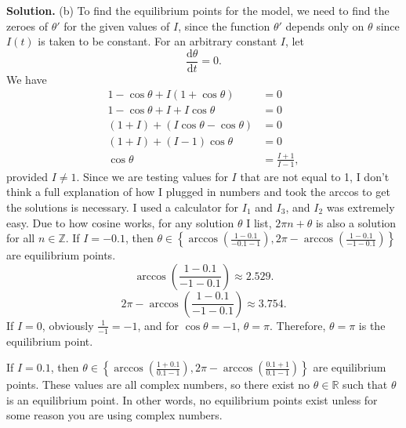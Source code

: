 \documentclass[11pt, letterpaper]{report}
\newenvironment{soln}[1][]{\noindent\textbf{Solution. }}{\hfill\qedsymbol}
\begin{document}
\begin{soln}
	(b) To find the equilibrium points for the model, we need to find the zeroes of $\theta '$ for the given values of $I$, since the function $\theta '$ depends only on $\theta $ since $I(t)$ is taken to be constant. For an arbitrary constant $I$, let
	\[
		\frac{\mathrm{d}\theta }{\mathrm{d}t} =0
	.\]
	We have
	\begin{align*}
		1-\cos \theta +I\left( 1+\cos \theta  \right) &=0\\
		1-\cos \theta +I+I\cos \theta &=0\\
		(1+I)+\left( I\cos \theta -\cos \theta  \right) &=0\\
		\left( 1+I \right) +\left( I-1 \right)\cos \theta  &=0\\
		\cos \theta &=\frac{I+1}{I-1}
	,\end{align*}
	provided $I\neq 1$. Since we are testing values for $I$ that are not equal to 1, I don't think a full explanation of how I plugged in numbers and took the arccos to get the solutions is necessary. I used a calculator for $I_1$ and $I_3$, and $I_2$ was extremely easy. Due to how cosine works, for any solution $\theta $ I list, $2\pi n +\theta $ is also a solution for all $n\in\mathbb{Z}$. If $I=-0.1$, then $\theta \in \left\{ \arccos \left( \frac{1-0.1}{-0.1-1} \right) ,2\pi -\arccos \left( \frac{1-0.1}{-1-0.1} \right)  \right\} $ are equilibrium points.
	\[
		\arccos \left( \frac{1-0.1}{-1-0.1} \right) \approx 2.529
	.\]
	\[
		2\pi -\arccos \left( \frac{1-0.1}{-1-0.1} \right) \approx 3.754
	.\]
	If $I=0$, obviously $\frac{1}{-1}=-1$, and for $\cos \theta =-1$, $\theta =\pi $. Therefore, $\theta =\pi $ is the equilibrium point.

	If $I=0.1$, then $\theta \in\left\{ \arccos \left( \frac{1+0.1}{0.1-1} \right) , 2\pi -\arccos \left( \frac{0.1+1}{0.1-1} \right)  \right\} $ are equilibrium points. These values are all complex numbers, so there exist no $\theta \in\mathbb{R}$ such that $\theta $ is an equilibrium point. In other words, no equilibrium points exist unless for some reason you are using complex numbers.
\end{soln}
\end{document}
